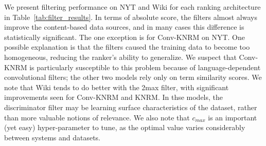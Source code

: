We present filtering performance on NYT and Wiki for each ranking architecture in Table~\ref{tab:filter_results}. In terms of absolute score, the filters almost always improve the content-based data sources, and in many cases this difference is statistically significant. The one exception is for Conv-KNRM on NYT. One possible explanation is that the filters caused the training data to become too homogeneous, reducing the ranker's ability to generalize. We suspect that Conv-KNRM is particularly susceptible to this problem because of language-dependent convolutional filters; the other two models rely only on term similarity scores. We note that Wiki tends to do better with the 2max filter, with significant improvements seen for Conv-KNRM and KNRM. In thse models, the discriminator filter may be learning surface characteristics of the dataset,
rather than more valuable notions of relevance. We also note that $c_{max}$ is an important (yet easy) hyper-parameter to tune, as the optimal value varies considerably between systems and datasets.
